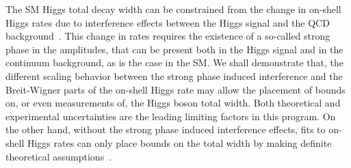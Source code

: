 
The SM Higgs total decay width can be constrained from the change in on-shell Higgs rates due to interference effects between the Higgs signal and the QCD background~\cite{Campbell:2017rke}. This change in rates requires the existence of a so-called strong phase in the amplitudes, that can be present both  in the Higgs signal and in the continuum background, as is the case in the SM. We shall demonstrate that,
the different scaling behavior between   the strong phase induced interference  and the Breit-Wigner parts of the on-shell Higgs rate may allow the placement of bounds on, or even measurements of, the Higgs boson total width.
Both theoretical and experimental uncertainties are the leading  limiting factors in this program. On the other hand, without  the strong phase induced interference effects, fits to on-shell Higgs rates can only place bounds on the total width by making definite theoretical assumptions~\cite{Duhrssen:2004cv,LHCHiggsCrossSectionWorkingGroup:2012nn,Dobrescu:2012td}. 

